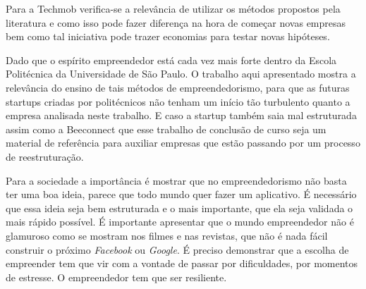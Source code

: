 Para a Techmob verifica-se a relevância de utilizar os métodos propostos pela literatura e como isso pode fazer diferença na hora de começar novas empresas bem como tal iniciativa pode trazer economias para testar novas hipóteses.

Dado que o espírito empreendedor está cada vez mais forte dentro da Escola Politécnica da Universidade de São Paulo. O trabalho aqui apresentado mostra a relevância do ensino de tais métodos de empreendedorismo, para que as futuras startups criadas por politécnicos não tenham um início tão turbulento quanto a empresa analisada neste trabalho. E caso a startup também saia mal estruturada assim como a Beeconnect que esse trabalho de conclusão de curso seja um material de referência para auxiliar empresas que estão passando por um processo de reestruturação.

Para a sociedade a importância é mostrar que no empreendedorismo não basta ter uma boa ideia, parece que todo mundo quer fazer um aplicativo. É necessário que essa ideia seja bem estruturada e o mais importante, que ela seja validada o mais rápido possível. É importante apresentar que o mundo empreendedor não é glamuroso como se mostram nos filmes e nas revistas, que não é nada fácil construir o próximo \textit{Facebook} ou \textit{Google}. É preciso demonstrar que a escolha de empreender tem que vir com a vontade de passar por dificuldades, por momentos de estresse. O empreendedor tem que ser resiliente. 
